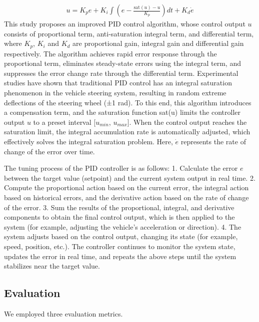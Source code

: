 \documentclass[lettersize,journal]{IEEEtran}
\begin{document}
\begin{align}
	u = K_p e + K_i \int \left( e - \frac{\text{sat}(u)-u}{K_p} \right) dt + K_d \dot{e}
\end{align}
This study proposes an improved PID control algorithm, whose control output \(u\) consists of proportional term, anti-saturation integral term, and differential term, where \(K_p\), \(K_i\) and \(K_d\) are proportional gain, integral gain and differential gain respectively.
The algorithm achieves rapid error response through the proportional term, eliminates steady-state errors using the integral term, and suppresses the error change rate through the differential term.
Experimental studies have shown that traditional PID control has an integral saturation phenomenon in the vehicle steering system, resulting in random extreme deflections of the steering wheel (±1 rad).
To this end, this algorithm introduces a compensation term, and the saturation function sat(u) limits the controller output \(u\) to a preset interval [\(u_{min}\), \(u_{max}\)].
When the control output reaches the saturation limit, the integral accumulation rate is automatically adjusted, which effectively solves the integral saturation problem.
Here, \(\dot{e}\) represents the rate of change of the error over time.

The tuning process of the PID controller is as follows:  
1. Calculate the error \(e\) between the target value (setpoint) and the current system output in real time.  
2. Compute the proportional action based on the current error, the integral action based on historical errors, and the derivative action based on the rate of change of the error.  
3. Sum the results of the proportional, integral, and derivative components to obtain the final control output, which is then applied to the system (for example, adjusting the vehicle's acceleration or direction). 
4. The system adjusts based on the control output, changing its state (for example, speed, position, etc.). 
The controller continues to monitor the system state, updates the error in real time, and repeats the above steps until the system stabilizes near the target value.


\subsection{Evaluation}

We employed three evaluation metrics.
\end{document}
